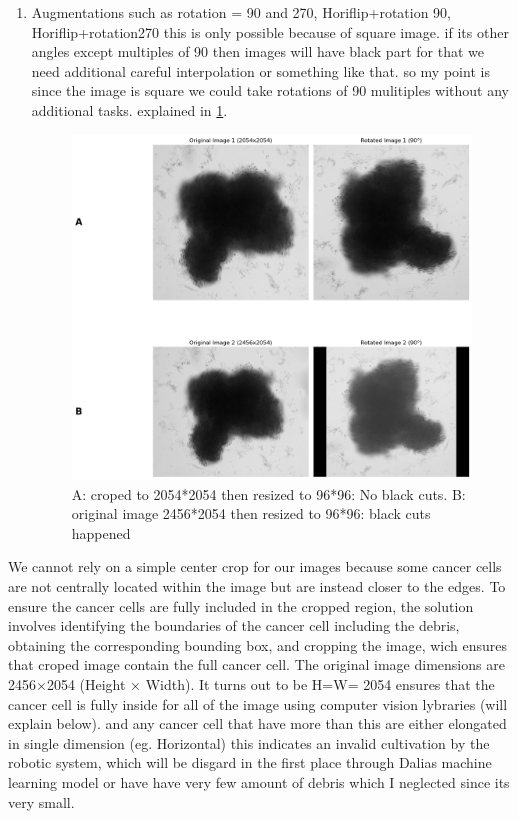 \begin{enumerate}
\begin{enumerate}
      \item Augmentations such as rotation = 90 and 270, Horiflip+rotation 90, Horiflip+rotation270 this is only possible because of square image. if its other 
      angles except multiples of 90 then images will have black part for that we need additional careful interpolation or something like that.
       so my point is since the image is square we could take rotations of 90 mulitiples without any additional tasks. explained in \ref{fig:rotation}.
       \begin{figure}[H]
        \centering
        \includegraphics[scale=0.46]{figures/rotation.png} 
        \caption{A: croped to 2054*2054 then resized to 96*96: No black cuts. B: 
        original image 2456*2054 then resized to 96*96: black cuts happened}
        \label{fig:rotation}
      \end{figure}
    \end{enumerate}

    We cannot rely on a simple center crop for our images because some cancer cells are not centrally located within the image but are instead closer to the 
edges. To ensure the cancer cells are fully included in the cropped region, the solution involves identifying the boundaries of the cancer cell including the
 debris, obtaining the corresponding bounding box, and cropping the image, wich ensures that croped image contain the full cancer cell. 
 The original image dimensions are 2456×2054 (Height × Width). It turns out to be H=W= 2054 ensures that the cancer cell is fully inside for all of the 
 image using computer vision lybraries (will explain below).
  and any cancer cell that have more than this are either elongated in single dimension (eg. Horizontal) this indicates an invalid cultivation by the robotic system,  which will be disgard in the first place through Dalias machine learning model 
  or have have very few amount of debris which I neglected since its very small.



\end{enumerate}
